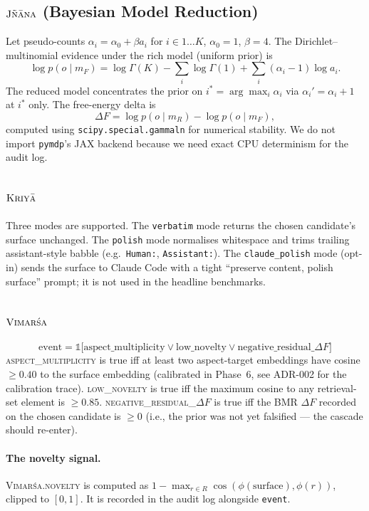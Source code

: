 \subsection{$\textsc{J\~n\=ana}$ (Bayesian Model Reduction)}
Let pseudo-counts $\alpha_i = \alpha_0 + \beta a_i$ for $i\in 1\dots K$, $\alpha_0 = 1$, $\beta = 4$. The Dirichlet--multinomial evidence under the rich model (uniform prior) is
\[
\log p(o\mid m_F) = \log\Gamma(K) - \sum_i \log\Gamma(1) + \sum_i (\alpha_i - 1)\log a_i.
\]
The reduced model concentrates the prior on $i^* = \arg\max_i \alpha_i$ via $\alpha_i' = \alpha_i + 1$ at $i^*$ only. The free-energy delta is
\[
\Delta F = \log p(o\mid m_R) - \log p(o\mid m_F),
\]
computed using \texttt{scipy.special.gammaln} for numerical stability. We do not import \texttt{pymdp}'s JAX backend because we need exact CPU determinism for the audit log.

\subsection{$\textsc{Kriy\=a}$}
Three modes are supported. The \texttt{verbatim} mode returns the chosen candidate's surface unchanged. The \texttt{polish} mode normalises whitespace and trims trailing assistant-style babble (e.g.\ \texttt{Human:}, \texttt{Assistant:}). The \texttt{claude\_polish} mode (opt-in) sends the surface to Claude Code with a tight ``preserve content, polish surface'' prompt; it is not used in the headline benchmarks.

\subsection{$\textsc{Vimar\'sa}$}
\[
\text{event} = \mathbb{1}\bigl[\text{aspect\_multiplicity} \lor \text{low\_novelty} \lor \text{negative\_residual\_}\Delta F\bigr]
\]
\textsc{aspect\_multiplicity} is true iff at least two aspect-target embeddings have cosine $\geq 0.40$ to the surface embedding (calibrated in Phase~6, see ADR-002 for the calibration trace).
\textsc{low\_novelty} is true iff the maximum cosine to any retrieval-set element is $\geq 0.85$.
\textsc{negative\_residual\_}$\Delta F$ is true iff the BMR $\Delta F$ recorded on the chosen candidate is $\geq 0$ (i.e., the prior was not yet falsified --- the cascade should re-enter).

\paragraph{The novelty signal.} \textsc{Vimar\'sa.novelty} is computed as $1 - \max_{r\in R}\cos(\phi(\text{surface}), \phi(r))$, clipped to $[0, 1]$. It is recorded in the audit log alongside \texttt{event}.

